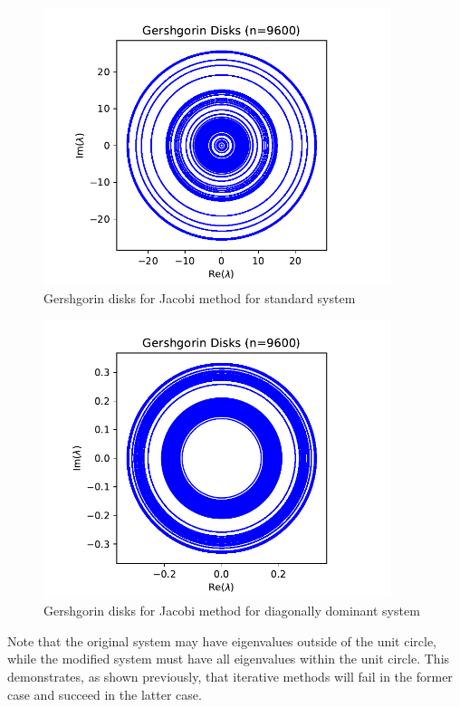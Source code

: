 \documentclass[10pt]{article}
\begin{document}
\begin{multicols}{2}
\begin{figure}[H]
	\centering
	\includegraphics[width=4in]{img/gersh_div.pdf}
	\caption{Gershgorin disks for Jacobi method for standard system}
\end{figure}
\begin{figure}[H]
	\centering
	\includegraphics[width=4in]{img/gersh_conv.pdf}
	\caption{Gershgorin disks for Jacobi method for diagonally dominant system}
\end{figure}
Note that the original system may have eigenvalues outside of the unit circle, while the modified system must have all eigenvalues within the unit circle.
This demonstrates, as shown previously, that iterative methods will fail in the former case and succeed in the latter case.



\end{multicols}
\end{document}
